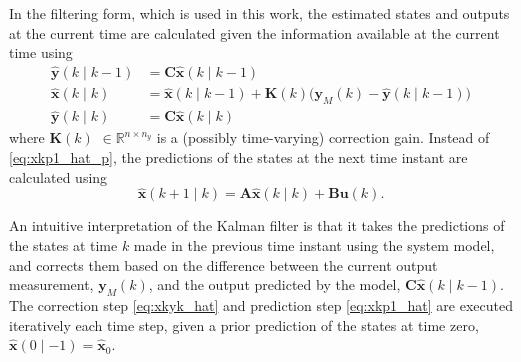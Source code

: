 In the filtering form, which is used in this work, the estimated states and outputs at the current time are calculated given the information available at the current time using
\begin{equation} \label{eq:xkyk_hat}
	\begin{aligned}
		\mathbf{\hat{y}}(k \mid k-1) &= \mathbf{C} \mathbf{\hat{x}}(k \mid k-1) \\
		\mathbf{\hat{x}}(k \mid k) &= \mathbf{\hat{x}}(k \mid k-1) + \mathbf{K}(k) \big( \mathbf{y}_M(k) - \mathbf{\hat{y}}(k \mid k-1)  \big) \\
		\mathbf{\hat{y}}(k \mid k) &= \mathbf{C} \mathbf{\hat{x}}(k \mid k)
	\end{aligned}
\end{equation}
%
%
where $\mathbf{K}(k)$ $\in \mathbb{R}^{n \times n_y}$ is a (possibly time-varying) correction gain. Instead of \eqref{eq:xkp1_hat_p}, the predictions of the states at the next time instant are calculated using
%
%
%
\begin{equation} \label{eq:xkp1_hat}
	\mathbf{\hat{x}}(k+1 \mid k) = \mathbf{A} \mathbf{\hat{x}}(k \mid k) + \mathbf{B} \mathbf{u}(k).
\end{equation}

An intuitive interpretation of the Kalman filter is that it takes the predictions of the states at time $k$ made in the previous time instant using the system model, and corrects them based on the difference between the current output measurement, $\mathbf{y}_M(k)$, and the output predicted by the model, $\mathbf{C} \mathbf{\hat{x}}(k \mid k-1)$. The correction step \eqref{eq:xkyk_hat} and prediction step \eqref{eq:xkp1_hat} are executed iteratively each time step, given a prior prediction of the states at time zero, $\mathbf{\hat{x}}(0 \mid -1)=\mathbf{\hat{x}}_0$.
%

